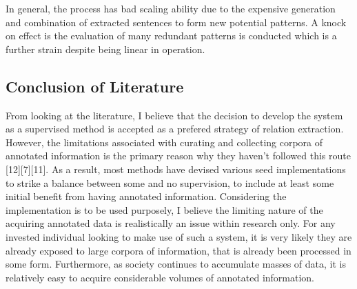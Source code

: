 \documentclass[11pt]{article} %
\begin{document}
In general, the process has bad scaling ability due to the expensive generation and combination of extracted sentences to form new potential patterns. A knock on effect is the evaluation of many redundant patterns is conducted which is a further strain despite being linear in operation.

\subsection{Conclusion of Literature}

From looking at the literature, I believe that the decision to develop the system as a supervised method is accepted as a prefered strategy of relation extraction. However, the limitations associated with curating and collecting corpora of annotated information is the primary reason why they haven’t followed this route [12][7][11]. As a result, most methods have devised various seed implementations to strike a balance between some and no supervision, to include at least some initial benefit from having annotated information. Considering the implementation is to be used purposely, I believe the limiting nature of the acquiring annotated data is realistically an issue within research only. For any invested individual looking to make use of such a system, it is very likely they are already exposed to large corpora of information, that is already been processed in some form. Furthermore, as society continues to accumulate masses of data, it is relatively easy to acquire considerable volumes of annotated information.
\end{document}

